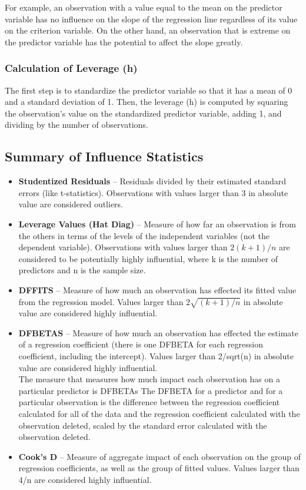 \documentclass[12pt, a4paper]{article}
\begin{document}
			For example, an observation with a value equal to the mean on the predictor variable has no influence on the slope of the regression line regardless of its value on the criterion variable. On the other hand, an observation that is extreme on the predictor variable has the potential to affect the slope greatly.
			
			\subsubsection{Calculation of Leverage (h)}
			The first step is to standardize the predictor variable so that it has a mean of 0 and a standard deviation of 1. Then, the leverage (h) is computed by squaring the observation's value on the standardized predictor variable, adding 1, and dividing by the number of observations.
			
			
			\subsection{Summary of Influence Statistics}
			\begin{itemize}
				\item	\textbf{Studentized Residuals} – Residuals divided by their estimated standard errors (like t-statistics). Observations with values larger than 3 in absolute value are considered outliers.
				\item	\textbf{Leverage Values (Hat Diag)} – Measure of how far an observation is from the others in terms of the levels of the independent variables (not the dependent variable). Observations with values larger than $2(k+1)/n$ are considered to be potentially highly influential, where k is the number of predictors and n is the sample size.
				\item	\textbf{DFFITS} – Measure of how much an observation has effected its fitted value from the regression model. Values larger than $2\sqrt{(k+1)/n}$ in absolute value are considered highly influential. %
				\item	\textbf{DFBETAS} – Measure of how much an observation has effected the estimate of a regression coefficient (there is one DFBETA for each regression coefficient, including the intercept). Values larger than 2/sqrt(n) in absolute value are considered highly influential.
				\\
				The measure that measures how much impact each observation has on a particular predictor is DFBETAs The DFBETA for a predictor and for a particular observation is the difference between the regression coefficient calculated for all of the data and the regression coefficient calculated with the observation deleted, scaled by the standard error calculated with the observation deleted. 
				
				\item	\textbf{Cook’s D} – Measure of aggregate impact of each observation on the group of regression coefficients, as well as the group of fitted values. Values larger than 4/n are considered highly influential.
			\end{itemize}
			
\end{document}
